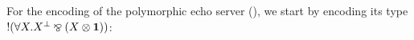 For the encoding of the polymorphic echo server (), we start by
encoding its type $\OfCourse(\forall\X.\dual\X \Par (X \Ten \One))$:

\begin{code}%
\>[0]\AgdaSpace{}%
\AgdaSymbol{:}\AgdaSpace{}%
\<%
\\
\>[0]\AgdaSpace{}%
\AgdaSymbol{=}\AgdaSpace{}%
\AgdaSpace{}%
\AgdaSymbol{(}\AgdaSpace{}%
\AgdaSymbol{(}\AgdaSpace{}%
\AgdaSymbol{(}\AgdaOperator{\AgdaFunction{\#}}\AgdaSpace{}%
\AgdaSymbol{)}\AgdaSpace{}%
\AgdaSpace{}%
\AgdaSymbol{(}\AgdaSpace{}%
\AgdaSymbol{(}\AgdaOperator{\AgdaFunction{\#}}\AgdaSpace{}%
\AgdaSymbol{)}\AgdaSpace{}%
\AgdaSpace{}%
\AgdaSymbol{)))}\<%
\end{code}

